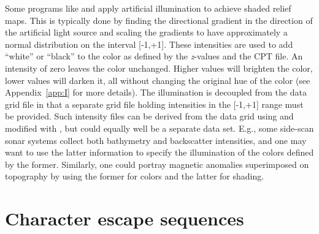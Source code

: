 

Some programs like  and  apply artificial
illumination to achieve shaded relief maps.  This is typically done
by finding the directional gradient in the direction of the artificial
light source and scaling the gradients to have approximately a normal
distribution on the interval [-1,+1].  These intensities are used
to add ``white'' or ``black'' to the color as defined by the \emph{z}-values
and the CPT file.  An intensity of zero leaves the color unchanged.
Higher values will brighten the color, lower values will darken it,
all without changing the original hue of the color (see Appendix~\ref{app:I}
for more details).  The illumination is decoupled from the data
grid file in that a separate grid file holding intensities in the
[-1,+1] range must be provided.  Such intensity files can be
derived from the data grid using  and modified
with , but could equally well be a separate data set.
E.g., some side-scan sonar systems collect both bathymetry and
backscatter intensities, and one may want to use the latter information
to specify the illumination of the colors defined by the former.
Similarly, one could portray magnetic anomalies superimposed on
topography by using the former for colors and the latter for shading. 

\section{Character escape sequences}
\label{sec:escape}

